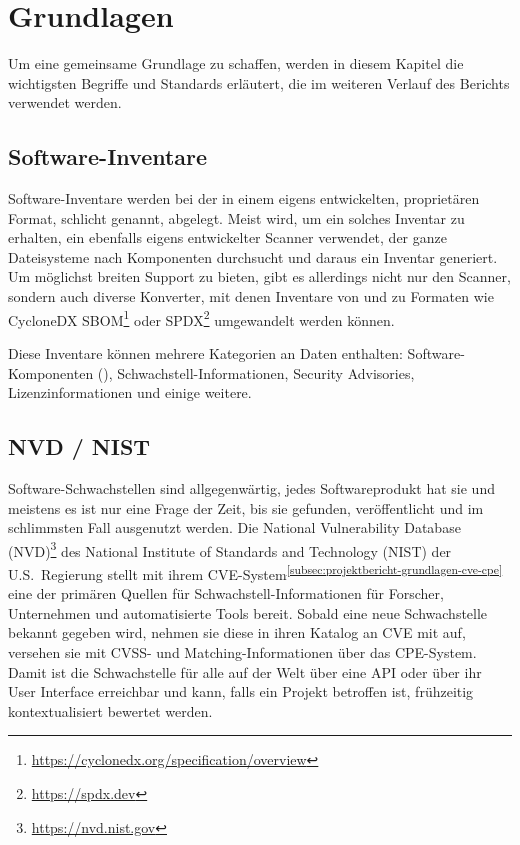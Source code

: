 \section{Grundlagen} \label{sec:projektbericht-grundlagen}

Um eine gemeinsame Grundlage zu schaffen, werden in diesem Kapitel die wichtigsten Begriffe und Standards erläutert, die im weiteren Verlauf des Berichts verwendet werden.

\subsection{Software-Inventare} \label{subsec:projektbericht-grundlagen-inventories}

Software-Inventare werden bei der {\metaeffekt} in einem eigens entwickelten, proprietären Format, schlicht  genannt, abgelegt.
Meist wird, um ein solches Inventar zu erhalten, ein ebenfalls eigens entwickelter Scanner verwendet, der ganze Dateisysteme nach Komponenten durchsucht und daraus ein Inventar generiert.
Um möglichst breiten Support zu bieten, gibt es allerdings nicht nur den Scanner, sondern auch diverse Konverter, mit denen Inventare von und zu Formaten wie CycloneDX SBOM\footnote{\url{https://cyclonedx.org/specification/overview}} oder SPDX\footnote{\url{https://spdx.dev}} umgewandelt werden können.

Diese Inventare können mehrere Kategorien an Daten enthalten: Software-Komponenten (), Schwachstell-Informationen, Security Advisories, Lizenzinformationen und einige weitere.

\subsection{NVD / NIST} \label{subsec:projektbericht-grundlagen-nvd-nist}

Software-Schwachstellen sind allgegenwärtig, jedes Softwareprodukt hat sie und meistens es ist nur eine Frage der Zeit, bis sie gefunden, veröffentlicht und im schlimmsten Fall ausgenutzt werden.
Die National Vulnerability Database (NVD)\footnote{\url{https://nvd.nist.gov}} des National Institute of Standards and Technology (NIST) der U.S.\ Regierung stellt mit ihrem CVE-System\textsuperscript{\ref{subsec:projektbericht-grundlagen-cve-cpe}} eine der primären Quellen für Schwachstell-Informationen für Forscher, Unternehmen und automatisierte Tools bereit.
Sobald eine neue Schwachstelle bekannt gegeben wird, nehmen sie diese in ihren Katalog an CVE mit auf, versehen sie mit CVSS- und Matching-Informationen über das CPE-System.
Damit ist die Schwachstelle für alle auf der Welt über eine API oder über ihr User Interface erreichbar und kann, falls ein Projekt betroffen ist, frühzeitig kontextualisiert bewertet werden.

